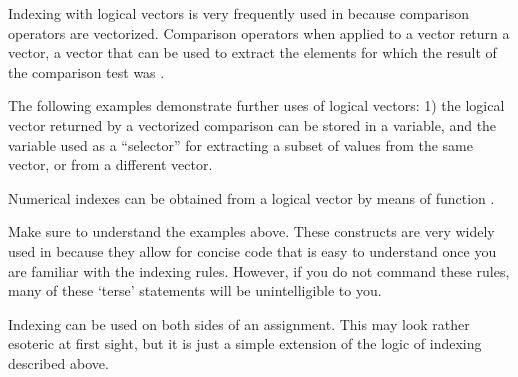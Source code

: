 \documentclass[krantz2]{krantz}\usepackage{knitr}%
\begin{document}
Indexing with logical vectors is very frequently used in \Rlang because comparison operators are vectorized. Comparison operators  when applied to a vector return a  vector, a vector that can be used to extract the elements for which the result of the comparison test was .

\begin{playground}
The following examples demonstrate further uses of logical vectors: 1) the logical vector returned by a vectorized comparison can be stored in a variable, and the variable used as a ``selector'' for extracting a subset of values from the same vector, or from a different vector.

\begin{knitrout}\footnotesize
{}\color{fgcolor}\begin{kframe}
\begin{alltt}
 \hlkwb{<-} \hlstd{letters[}\hlopt{:}\hlstd{]}
 \hlkwb{<-} \hlopt{:}
 \hlkwb{<-}  \hlopt{>} 
\end{alltt}
\end{kframe}
\end{knitrout}

Numerical indexes can be obtained from a logical vector by means of function .

\begin{knitrout}\footnotesize
{}\color{fgcolor}\begin{kframe}
\begin{alltt}
 \hlkwb{<-}  \hlopt{>} \hlstd{)}
\end{alltt}
\end{kframe}
\end{knitrout}

Make sure to understand the examples above. These constructs are very widely used in \Rlang because they allow for concise code that is easy to understand once you are familiar with the indexing rules. However, if you do not command these rules, many of these `terse' statements will be unintelligible to you.
\end{playground}

Indexing can be used on both sides of an assignment. This may look rather esoteric at first sight, but it is just a simple extension of the logic of indexing described above.
\end{document}

